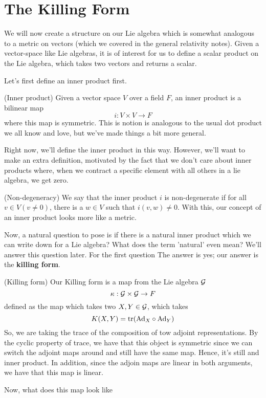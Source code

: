 \section{The Killing Form}
We will now create a structure on 
our Lie algebra which is somewhat analogous to a 
metric on vectors (which we covered 
in the general relativity notes). 
Given a vector-space like Lie algebras, 
it is of interest for us to define a scalar product 
on the Lie algebra, which takes two vectors and returns a scalar. 

Let's first define an inner product first. 
\begin{defn}{(Inner product)} 
	Given a vector space $ V $ over a field $ F $, an inner product is 
	a bilinear map 
	\[
	 i : V \times V \to F 
	\] where this map is symmetric. This is notion is 
	analogous to the usual dot product we all know and love, 
	but we've made things a bit more general. 
\end{defn}
Right now, we'll define the inner product in this way. 
However, we'll want to make an extra definition, 
motivated by the fact that we don't care about inner 
products where, when we contract a specific element with 
all others in a lie algebra, we get zero. 
\begin{defn}{(Non-degeneracy)} 
	 We say that the inner product $ i $ is non-degenerate 
	 if for all $ v \in V ( v \neq  0 ) $, there 
	 is a $ w \in V $ such that $ i ( v, w ) \neq 0$. 
	 With this, our concept of an inner product looks more like a metric. 
\end{defn}
Now, a natural question 
to pose is if there is a natural inner product which we can 
write down for a Lie algebra? What does the term 'natural' 
even mean? We'll answer this question later. 
For the first question The answer is yes; our answer is the \textbf{killing form}. 
\begin{defn}{(Killing form)} 
	Our Killing form is a map from the Lie algebra $ \mathcal{ G } $
	 \[
	 \kappa : \mathcal{ G } \times \mathcal{ G } \to F 
	\] defined as the map which takes two $ X , Y  \in \mathcal{ G } $, 
	which takes 
	\[
	 K ( X, Y )  = \tr ( \text{Ad}_ X \circ \text{Ad} _ Y ) 
	\] So, we are taking 
	the trace of the composition of tow adjoint 
	representations. By the cyclic property of trace, we have that 
	this object is symmetric since we 
	can switch the adjoint maps around and still have the same map. Hence, 
	it's still and inner product. 
	In addition, since the adjoin maps are linear in both arguments, 
	we have that this map is linear. 
\end{defn}
Now, what does this map look like 

